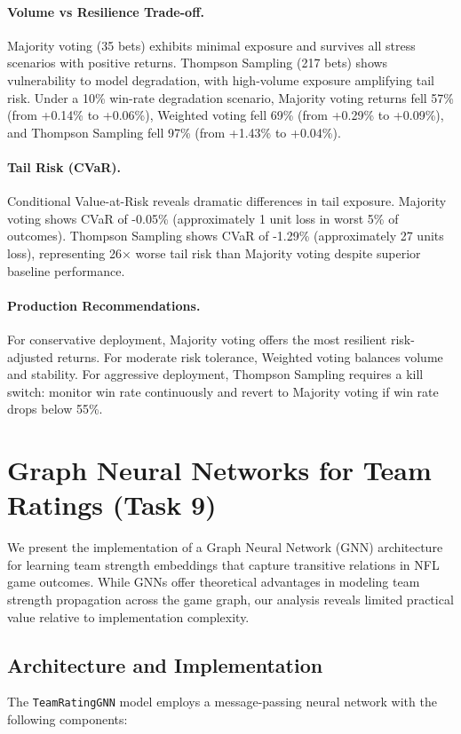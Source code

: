 \documentclass[12pt]{report}  %
\numberwithin{equation}{section}
\theoremstyle{plain}
\theoremstyle{definition}
\theoremstyle{remark}
\begin{document}
\paragraph{Volume vs Resilience Trade-off.}
Majority voting (35 bets) exhibits minimal exposure and survives all stress scenarios with positive returns. Thompson Sampling (217 bets) shows vulnerability to model degradation, with high-volume exposure amplifying tail risk. Under a 10\% win-rate degradation scenario, Majority voting returns fell 57\% (from +0.14\% to +0.06\%), Weighted voting fell 69\% (from +0.29\% to +0.09\%), and Thompson Sampling fell 97\% (from +1.43\% to +0.04\%).

\paragraph{Tail Risk (CVaR).}
Conditional Value-at-Risk reveals dramatic differences in tail exposure. Majority voting shows CVaR of -0.05\% (approximately 1 unit loss in worst 5\% of outcomes). Thompson Sampling shows CVaR of -1.29\% (approximately 27 units loss), representing 26× worse tail risk than Majority voting despite superior baseline performance.

\paragraph{Production Recommendations.}
For conservative deployment, Majority voting offers the most resilient risk-adjusted returns. For moderate risk tolerance, Weighted voting balances volume and stability. For aggressive deployment, Thompson Sampling requires a kill switch: monitor win rate continuously and revert to Majority voting if win rate drops below 55\%.

\section{Graph Neural Networks for Team Ratings (Task 9)}
We present the implementation of a Graph Neural Network (GNN) architecture for learning team strength embeddings that capture transitive relations in NFL game outcomes. While GNNs offer theoretical advantages in modeling team strength propagation across the game graph, our analysis reveals limited practical value relative to implementation complexity.

\subsection{Architecture and Implementation}
The \texttt{TeamRatingGNN} model employs a message-passing neural network with the following components:
\end{document}
